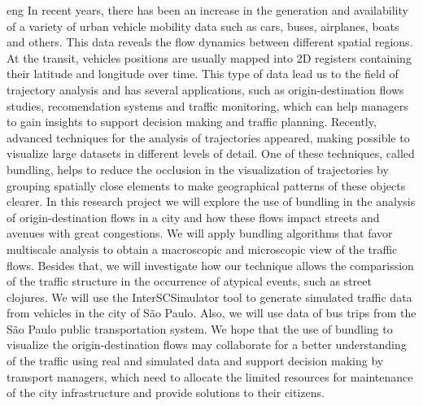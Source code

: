 \begin{resumo}{eng} 
In recent years, there has been an increase in the generation and availability
of a variety of urban vehicle mobility data such as cars, buses, airplanes,
boats and others.  This data reveals the flow dynamics between different
spatial regions. At the transit, vehicles positions are usually mapped into 2D
registers containing their latitude and longitude over time.  This type of data
lead us to the field of trajectory analysis and has several applications, such
as origin-destination flows studies, recomendation systems and traffic
monitoring, which can help managers to gain insights to support decision making
and traffic planning.  Recently, advanced techniques for the analysis of
trajectories appeared, making possible to visualize large datasets in different
levels of detail.  One of these techniques, called bundling, helps to reduce
the occlusion in the visualization of trajectories by grouping spatially close
elements to make geographical patterns of these objects clearer.  In this
research project we will explore the use of bundling in the analysis of
origin-destination flows in a city and how these flows impact streets and
avenues with great congestions.  We will apply bundling algorithms that favor
multiscale analysis to obtain a macroscopic and microscopic view of the traffic
flows. Besides that, we will investigate how our technique allows the
comparission of the traffic structure in the occurrence of atypical events,
such as street clojures. We will use the InterSCSimulator tool to generate
simulated traffic data from vehicles in the city of São Paulo. Also, we will
use data of bus trips from the São Paulo public transportation system. We hope
that the use of bundling to visualize the origin-destination flows may
collaborate for a better understanding of the traffic using real and simulated
data and support decision making by transport managers, which need to allocate
the limited resources for maintenance of the city infrastructure and provide
solutions to their citizens.
\end{resumo}
